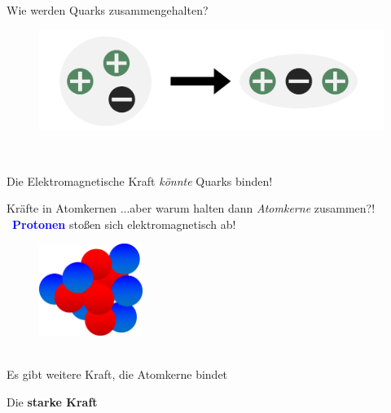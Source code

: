 \begin{frame}{Wie werden Quarks zusammengehalten?}  
    \begin{figure}[htb]
        \includegraphics[width=1\textwidth]{Figures Introductory Lecture/Standard Model/StrongForce_EM.png}
        \label{fig:strong_force_1}
    \end{figure} \\
    \Large \begin{center}
        Die Elektromagnetische Kraft \emph{könnte} Quarks binden!
    \end{center}
\end{frame}
\begin{frame}{Kräfte in Atomkernen}
...aber warum halten dann \emph{Atomkerne} zusammen?!\\ \, \hspace{2cm}  \textcolor{blue}{\textbf{Protonen}} stoßen sich elektromagnetisch ab!

    \begin{figure}[htb]
        \includegraphics[width=0.3\textwidth]{Figures Introductory Lecture/Standard Model/Nukleus.png}
        \label{fig:strong_force_2}
    \end{figure}\\ \pause
     Es gibt weitere Kraft, die Atomkerne bindet\\ 
    \vspace{0.5cm}\begin{center}
    \Large{Die \textbf{starke Kraft}}
    \end{center}
\end{frame}
